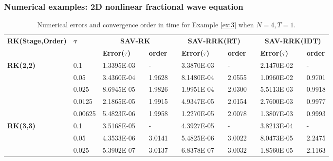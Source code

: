 \documentclass[aspectratio=169]{beamer}
\begin{document}
	\begin{frame}\frametitle{Numerical examples: 2D nonlinear fractional wave equation}
	  \begin{table}[H]\tiny
		\centering
		\caption{Numerical errors and convergence order in time for Example \ref{ex:3} when $N=4, T = 1$.}
		\begin{tabular}{lllllrlrlrlrlrl}
		\toprule
		\multicolumn{2}{l}{\multirow{2}[3]{*}{\textbf{RK(Stage,Order)}}} & \multicolumn{2}{l}{\multirow{2}[3]{*}{$\bm{\tau}$}} & \multicolumn{3}{c}{\textbf{SAV-RK}} &       & \multicolumn{3}{c}{\textbf{SAV-RRK(RT)}} &       & \multicolumn{3}{c}{\textbf{SAV-RRK(IDT)}} \\
		\cmidrule{5-7}\cmidrule{9-11}\cmidrule{13-15}    \multicolumn{2}{l}{} & \multicolumn{2}{l}{} & \textbf{Error($\tau$)} &       & \textbf{order} &       & \textbf{Error($\tau$)} &       & \textbf{order} &       & \textbf{Error($\tau$)} &       & \textbf{order} \\
		\hline
		\multicolumn{2}{l}{\multirow{5}[0]{*}{\textbf{RK(2,2)}}} & \multicolumn{2}{l}{0.1} & 1.3395E-03 &       & -     &       & 3.3870E-03 &       & -     &       & 2.1470E-02 &       & - \\
		\multicolumn{2}{l}{} & \multicolumn{2}{l}{0.05} & 3.4360E-04 &       & 1.9628  &       & 8.1480E-04 &       & 2.0555  &       & 1.0960E-02 &       & 0.9701  \\
		\multicolumn{2}{l}{} & \multicolumn{2}{l}{0.025} & 8.6945E-05 &       & 1.9826  &       & 1.9951E-04 &       & 2.0300  &       & 5.5113E-03 &       & 0.9918  \\
		\multicolumn{2}{l}{} & \multicolumn{2}{l}{0.0125} & 2.1865E-05 &       & 1.9915  &       & 4.9347E-05 &       & 2.0154  &       & 2.7600E-03 &       & 0.9977  \\
		\multicolumn{2}{l}{} & \multicolumn{2}{l}{0.00625} & 5.4823E-06 &       & 1.9958  &       & 1.2270E-05 &       & 2.0078  &       & 1.3807E-03 &       & 0.9993  \\
		\multicolumn{2}{l}{\multirow{5}[0]{*}{\textbf{RK(3,3)}}} & \multicolumn{2}{l}{0.1} & 3.5168E-05 &       & -     &       & 4.3927E-05 &       & -     &       & 3.8213E-04 &       & - \\
		\multicolumn{2}{l}{} & \multicolumn{2}{l}{0.05} & 4.3533E-06 &       & 3.0141  &       & 5.4825E-06 &       & 3.0022  &       & 8.0473E-05 &       & 2.2475  \\
		\multicolumn{2}{l}{} & \multicolumn{2}{l}{0.025} & 5.3902E-07 &       & 3.0137  &       & 6.8378E-07 &       & 3.0032  &       & 1.8560E-05 &       & 2.1163  \\

\end{tabular}
\end{table}
\end{frame}
\end{document}
